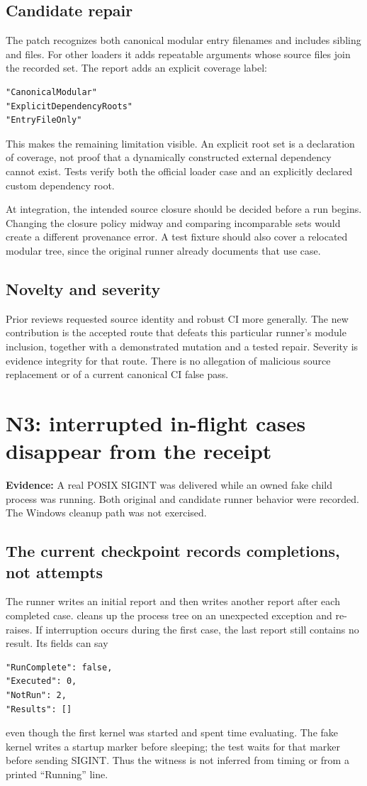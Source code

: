 \documentclass[11pt,letterpaper]{article}
\newcommand{\code}[1]{\texttt{\detokenize{#1}}}
\newcommand{\evidence}[1]{\textbf{Evidence:} #1}
\begin{document}
\subsection{Candidate repair}
The patch recognizes both canonical modular entry filenames and includes sibling \code{.wl} and \code{.m} files. For other loaders it adds repeatable \code{--dependency-root} arguments whose source files join the recorded set. The report adds an explicit coverage label:
\begin{lstlisting}
"CanonicalModular"
"ExplicitDependencyRoots"
"EntryFileOnly"
\end{lstlisting}
This makes the remaining limitation visible. An explicit root set is a declaration of coverage, not proof that a dynamically constructed external dependency cannot exist. Tests verify both the official loader case and an explicitly declared custom dependency root.

At integration, the intended source closure should be decided before a run begins. Changing the closure policy midway and comparing incomparable sets would create a different provenance error. A test fixture should also cover a relocated modular tree, since the original runner already documents that use case.

\subsection{Novelty and severity}
Prior reviews requested source identity and robust CI more generally. The new contribution is the accepted \code{init.m} route that defeats this particular runner's module inclusion, together with a demonstrated mutation and a tested repair. Severity is evidence integrity for that route. There is no allegation of malicious source replacement or of a current canonical CI false pass.

\section{N3: interrupted in-flight cases disappear from the receipt}
\evidence{A real POSIX SIGINT was delivered while an owned fake child process was running. Both original and candidate runner behavior were recorded. The Windows cleanup path was not exercised.}

\subsection{The current checkpoint records completions, not attempts}
The runner writes an initial report and then writes another report after each completed case. \code{run_case} cleans up the process tree on an unexpected exception and re-raises. If interruption occurs during the first case, the last report still contains no result. Its fields can say
\begin{lstlisting}
"RunComplete": false,
"Executed": 0,
"NotRun": 2,
"Results": []
\end{lstlisting}
even though the first kernel was started and spent time evaluating. The fake kernel writes a startup marker before sleeping; the test waits for that marker before sending SIGINT. Thus the witness is not inferred from timing or from a printed ``Running'' line.\cite{runner}
\end{document}
